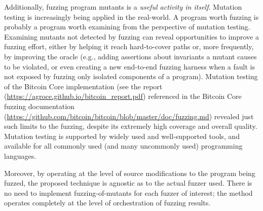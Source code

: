 Additionally, fuzzing program mutants is a \emph{useful activity in itself}.  Mutation testing is increasingly being applied in the real-world.
A program worth fuzzing is probably a program worth examining from the perspective of mutation testing.  Examining mutants not detected by fuzzing
can reveal opportunities to improve a fuzzing effort, either by helping it reach hard-to-cover paths or, more frequently, by improving the oracle
(e.g., adding assertions about invariants a mutant causes to be violated, or even creating a new end-to-end fuzzing harness when a fault is
not exposed by fuzzing only isolated components of a program).  Mutation testing of the Bitcoin Core implementation (see the report
(\url{https://agroce.github.io/bitcoin_report.pdf}) referenced in the Bitcoin Core fuzzing documentation
(\url{https://github.com/bitcoin/bitcoin/blob/master/doc/fuzzing.md}) revealed just such limits to the fuzzing, despite its 
extremely high coverage and overall quality.  Mutation testing is supported by widely used and well-supported tools, and available for all
commonly used (and many uncommonly used) programming languages.

Moreover, by operating at the level of source modifications to the program being fuzzed, the proposed technique is agnostic as to the actual fuzzer used.  There is no need to implement fuzzing-of-mutants for each fuzzer of interest; the method operates completely at the level of orchestration of fuzzing results.
